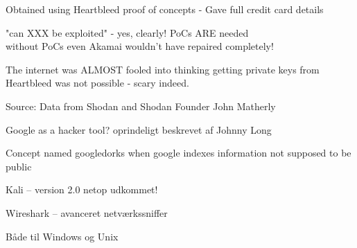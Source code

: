 \documentclass[20pt,landscape,a4paper,footrule]{foils}
\begin{document}
\begin{list2}
\item Obtained using Heartbleed proof of concepts - Gave full credit card details
\item "can XXX be exploited" - yes, clearly! PoCs ARE needed\\
without PoCs even Akamai wouldn't have repaired completely!
\item The internet was ALMOST fooled into thinking getting private keys from Heartbleed was not possible - scary indeed.
\end{list2}





Source: Data from Shodan and Shodan Founder John Matherly




\begin{list1}
\item Google as a hacker tool? oprindeligt beskrevet af Johnny Long
\item Concept named googledorks when google indexes information not supposed to be public
\end{list1}




\begin{list1}
\item Kali --  version 2.0 netop udkommet!
\item Wireshark --  avanceret netværkssniffer
\end{list1}




\centerline{}
\centerline{Både til Windows og Unix}



\end{document}
